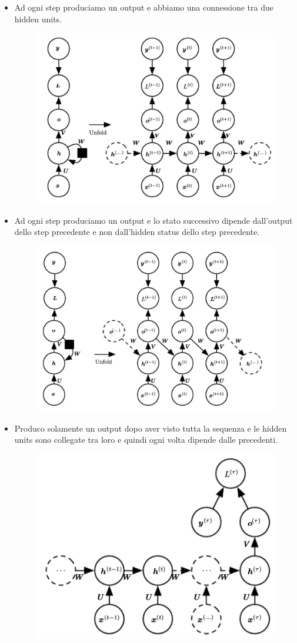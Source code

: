 \documentclass[14pt]{extreport}
\begin{document}
\begin{itemize}
\item Ad ogni step produciamo un output e abbiamo una connessione tra due hidden units.
\begin{figure}[H]
	\centering
	\includegraphics[width=0.7\linewidth]{420.jpeg}
	\end{figure}
\item Ad ogni step produciamo un output e lo stato successivo dipende dall'output dello step precedente e non dall'hidden status dello step precedente.
\begin{figure}[H]
	\centering
	\includegraphics[width=0.7\linewidth]{421.jpeg}
	\end{figure}
\item Produco solamente un output dopo aver visto tutta la sequenza e le hidden units sono collegate tra loro e quindi ogni volta dipende dalle precedenti.
\begin{figure}[H]
	\centering
	\includegraphics[width=0.7\linewidth]{422.jpeg}
	\end{figure}
\end{itemize}
\end{document}
